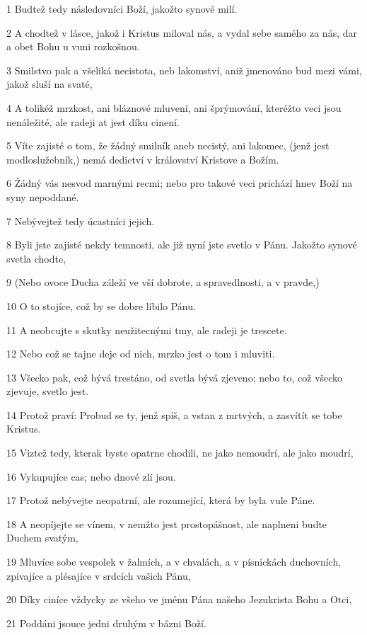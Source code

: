 \par 1 Budtež tedy následovníci Boží, jakožto synové milí.
\par 2 A chodtež v lásce, jakož i Kristus miloval nás, a vydal sebe samého za nás, dar a obet Bohu u vuni rozkošnou.
\par 3 Smilstvo pak a všeliká necistota, neb lakomství, aniž jmenováno bud mezi vámi, jakož sluší na svaté,
\par 4 A tolikéž mrzkost, ani bláznové mluvení, ani šprýmování, kteréžto veci jsou nenáležité, ale radeji at jest díku cinení.
\par 5 Víte zajisté o tom, že žádný smilník aneb necistý, ani lakomec, (jenž jest modloslužebník,) nemá dedictví v království Kristove a Božím.
\par 6 Žádný vás nesvod marnými recmi; nebo pro takové veci prichází hnev Boží na syny nepoddané.
\par 7 Nebývejtež tedy úcastníci jejich.
\par 8 Byli jste zajisté nekdy temnosti, ale již nyní jste svetlo v Pánu. Jakožto synové svetla chodte,
\par 9 (Nebo ovoce Ducha záleží ve vší dobrote, a spravedlnosti, a v pravde,)
\par 10 O to stojíce, což by se dobre líbilo Pánu.
\par 11 A neobcujte s skutky neužitecnými tmy, ale radeji je trescete.
\par 12 Nebo což se tajne deje od nich, mrzko jest o tom i mluviti.
\par 13 Všecko pak, což bývá trestáno, od svetla bývá zjeveno; nebo to, což všecko zjevuje, svetlo jest.
\par 14 Protož praví: Probud se ty, jenž spíš, a vstan z mrtvých, a zasvítít se tobe Kristus.
\par 15 Viztež tedy, kterak byste opatrne chodili, ne jako nemoudrí, ale jako moudrí,
\par 16 Vykupujíce cas; nebo dnové zlí jsou.
\par 17 Protož nebývejte neopatrní, ale rozumející, která by byla vule Páne.
\par 18 A neopíjejte se vínem, v nemžto jest prostopášnost, ale naplneni budte Duchem svatým,
\par 19 Mluvíce sobe vespolek v žalmích, a v chvalách, a v písnickách duchovních, zpívajíce a plésajíce v srdcích vašich Pánu,
\par 20 Díky ciníce vždycky ze všeho ve jménu Pána našeho Jezukrista Bohu a Otci,
\par 21 Poddáni jsouce jedni druhým v bázni Boží.
